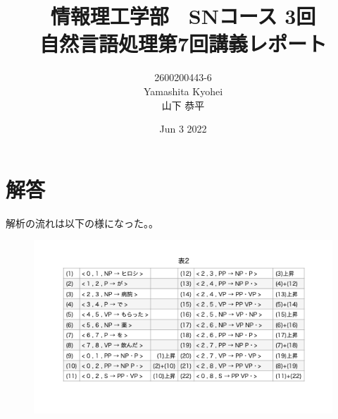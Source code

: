 \documentclass[dvipdfmx,autodetect-engine,titlepage]{jsarticle}
\title{情報理工学部　SNコース 3回\\
自然言語処理第7回講義レポート\\}
\author{2600200443-6\\Yamashita Kyohei\\山下 恭平}
\date{Jun 3 2022}
\begin{document}
\maketitle

\section{解答}
解析の流れは以下の様になった。。

\begin{figure}[h]
  \centering
  \includegraphics[scale=0.7]{pic1.png}
\end{figure}
\end{document}
